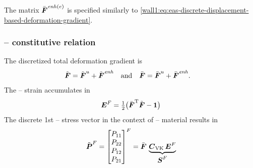 The matrix $\bar{\boldsymbol{F}}^{\mathit{enh}(e)}$ is specified similarly to
\eqref{wall1:eq:eas-discrete-displacement-based-deformation-gradient}. 

\subsubsection{-- constitutive relation}
The discretized total deformation gradient is
\begin{align}
  \tilde{\boldsymbol{F}}
& = \tilde{\boldsymbol{F}}^u
  + \tilde{\boldsymbol{F}}^{\mathit{enh}}
&&\text{and}
& \bar{\boldsymbol{F}}
& = \bar{\boldsymbol{F}}^u
  + \bar{\boldsymbol{F}}^{\mathit{enh}}
  \text{.}
\end{align}
The -- strain accumulates in
\begin{equation}
  \boldsymbol{E}^F
  = \tfrac{1}{2} \big( \bar{\boldsymbol{F}}^{\mathrm{T}} \tilde{\boldsymbol{F}} - \boldsymbol{1} \big)
\end{equation}
The discrete 1st -- stress vector in the context
of -- material results in
\begin{equation}\label{wall1:eq:eas-1st-pk-stress}
  \tilde{\boldsymbol{P}}^F
  = \begin{bmatrix}
    P_{11} \\ P_{22} \\ P_{12} \\ P_{21}
  \end{bmatrix}^F
  = \bar{\boldsymbol{F}}
    \, \underbrace{\boldsymbol{C}_{\text{VK}} \, \boldsymbol{E}^F}_{\displaystyle\boldsymbol{S}^F}
\end{equation}


